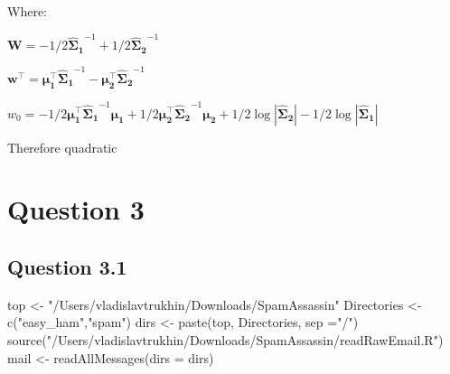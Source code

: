 \documentclass[
]{article}
\newenvironment{Shaded}{\begin{snugshade}}{\end{snugshade}}
\newcommand{\AttributeTok}[1]{\textcolor[rgb]{0.77,0.63,0.00}{#1}}
\newcommand{\FunctionTok}[1]{\textcolor[rgb]{0.00,0.00,0.00}{#1}}
\newcommand{\NormalTok}[1]{#1}
\newcommand{\OtherTok}[1]{\textcolor[rgb]{0.56,0.35,0.01}{#1}}
\newcommand{\StringTok}[1]{\textcolor[rgb]{0.31,0.60,0.02}{#1}}
\begin{document}
Where:

\(\mathbf{W} = -1/2\mathbf{\hat\Sigma_1}^{-1} + 1/2\mathbf{\hat\Sigma_2}^{-1}\)

\(\mathbf{w^\top} = \mathbf{\mu_1^\top}\mathbf{\hat\Sigma_1}^{-1} - \mathbf{\mu_2^\top}\mathbf{\hat\Sigma_2}^{-1}\)

\(w_0 = - 1/2\mathbf{\mu_1^\top}\mathbf{\hat\Sigma_1}^{-1}\mathbf{\mu_1} + 1/2\mathbf{\mu_2^\top}\mathbf{\hat\Sigma_2}^{-1}\mathbf{\mu_2} + 1/2\log|\mathbf{\hat\Sigma_2}| - 1/2\log|\mathbf{\hat\Sigma_1}|\)

Therefore quadratic

\hypertarget{question-3}{%
\section{Question 3}\label{question-3}}

\hypertarget{question-3.1}{%
\subsection{Question 3.1}\label{question-3.1}}

\begin{Shaded}
\begin{Highlighting}[]
\NormalTok{top }\OtherTok{\textless{}{-}} \StringTok{"/Users/vladislavtrukhin/Downloads/SpamAssassin"}
\NormalTok{Directories }\OtherTok{\textless{}{-}} \FunctionTok{c}\NormalTok{(}\StringTok{"easy\_ham"}\NormalTok{,}\StringTok{"spam"}\NormalTok{)}
\NormalTok{dirs }\OtherTok{\textless{}{-}} \FunctionTok{paste}\NormalTok{(top, Directories, }\AttributeTok{sep =}\StringTok{"/"}\NormalTok{)}
\FunctionTok{source}\NormalTok{(}\StringTok{"/Users/vladislavtrukhin/Downloads/SpamAssassin/readRawEmail.R"}\NormalTok{)}
\NormalTok{mail }\OtherTok{\textless{}{-}} \FunctionTok{readAllMessages}\NormalTok{(}\AttributeTok{dirs =}\NormalTok{ dirs)}
\end{Highlighting}
\end{Shaded}
\end{document}
